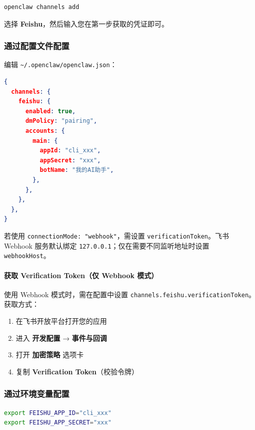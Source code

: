 \begin{lstlisting}[language=bash]
openclaw channels add
\end{lstlisting}


选择 \textbf{Feishu}，然后输入您在第一步获取的凭证即可。

\subsubsection{通过配置文件配置}


编辑 \texttt{\textasciitilde{}/.openclaw/openclaw.json}：

\begin{lstlisting}[language=json]
{
  channels: {
    feishu: {
      enabled: true,
      dmPolicy: "pairing",
      accounts: {
        main: {
          appId: "cli_xxx",
          appSecret: "xxx",
          botName: "我的AI助手",
        },
      },
    },
  },
}
\end{lstlisting}


若使用 \texttt{connectionMode: "webhook"}，需设置 \texttt{verificationToken}。飞书 Webhook 服务默认绑定 \texttt{127.0.0.1}；仅在需要不同监听地址时设置 \texttt{webhookHost}。

\paragraph{获取 Verification Token（仅 Webhook 模式）}


使用 Webhook 模式时，需在配置中设置 \texttt{channels.feishu.verificationToken}。获取方式：

\begin{enumerate}
  \item 在飞书开放平台打开您的应用
  \item 进入 \textbf{开发配置} → \textbf{事件与回调}
  \item 打开 \textbf{加密策略} 选项卡
  \item 复制 \textbf{Verification Token}（校验令牌）
\end{enumerate}



\subsubsection{通过环境变量配置}


\begin{lstlisting}[language=bash]
export FEISHU_APP_ID="cli_xxx"
export FEISHU_APP_SECRET="xxx"
\end{lstlisting}


